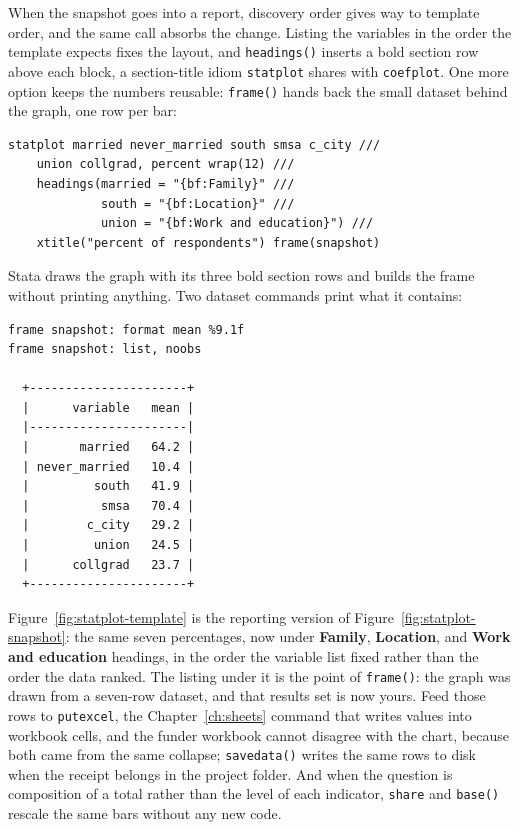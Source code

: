 \documentclass[
    a4paper,
    fontsize=10pt,
    twoside=true,
    numbers=noenddot,
]{kaobook}
\begin{document}
When the snapshot goes into a report, discovery order gives way to template order, and the same call absorbs the change. Listing the variables in the order the template expects fixes the layout, and \texttt{headings()} inserts a bold section row above each block, a section-title idiom \texttt{statplot} shares with \texttt{coefplot}. One more option keeps the numbers reusable: \texttt{frame()} hands back the small dataset behind the graph, one row per bar:
\par
{\footnotesize
\begin{verbatim}
statplot married never_married south smsa c_city ///
    union collgrad, percent wrap(12) ///
    headings(married = "{bf:Family}" ///
             south = "{bf:Location}" ///
             union = "{bf:Work and education}") ///
    xtitle("percent of respondents") frame(snapshot)
\end{verbatim}
}
Stata draws the graph with its three bold section rows and builds the frame without printing anything. Two dataset commands print what it contains:
\par
{\footnotesize
\begin{verbatim}
frame snapshot: format mean %9.1f
frame snapshot: list, noobs

  +----------------------+
  |      variable   mean |
  |----------------------|
  |       married   64.2 |
  | never_married   10.4 |
  |         south   41.9 |
  |          smsa   70.4 |
  |        c_city   29.2 |
  |         union   24.5 |
  |      collgrad   23.7 |
  +----------------------+
\end{verbatim}
}
Figure~\ref{fig:statplot-template} is the reporting version of Figure~\ref{fig:statplot-snapshot}: the same seven percentages, now under \textbf{Family}, \textbf{Location}, and \textbf{Work and education} headings, in the order the variable list fixed rather than the order the data ranked. The listing under it is the point of \texttt{frame()}: the graph was drawn from a seven-row dataset, and that results set is now yours. Feed those rows to \texttt{putexcel}, the Chapter~\ref{ch:sheets} command that writes values into workbook cells, and the funder workbook cannot disagree with the chart, because both came from the same collapse; \texttt{savedata()} writes the same rows to disk when the receipt belongs in the project folder. And when the question is composition of a total rather than the level of each indicator, \texttt{share} and \texttt{base()} rescale the same bars without any new code.
\end{document}
